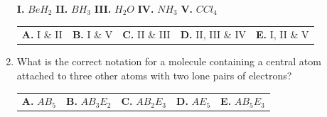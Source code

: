\documentclass[11pt]{article}
\begin{document}
\begin{enumerate}[leftmargin=*, label=\arabic*.]
    \noindent \textbf{I.} $BeH_2$ \hspace{1cm} \textbf{II.} $BH_3$ \hspace{1cm} \textbf{III.} $H_2O$ \hspace{1cm} \textbf{IV.} $NH_3$ \hspace{1cm} \textbf{V.} $CCl_4$ \vspace{0.5em}
    
    \noindent
    \begin{tabularx}{\textwidth}{XXXXX}
        \textbf{A.} I \& II & \textbf{B.} I \& V & \textbf{C.} II \& III & \textbf{D.} II, III \& IV & \textbf{E.} I, II \& V
    \end{tabularx}
    \vspace{1em}

    \item What is the correct notation for a molecule containing a central atom attached to three other atoms with two lone pairs of electrons?
    
    \begin{tabularx}{\textwidth}{XXXXX}
        \textbf{A.} $AB_5$ & \textbf{B.} $AB_3E_2$ & \textbf{C.} $AB_2E_3$ & \textbf{D.} $AE_5$ & \textbf{E.} $AB_5E_3$
    \end{tabularx}
\end{enumerate}
\end{document}

